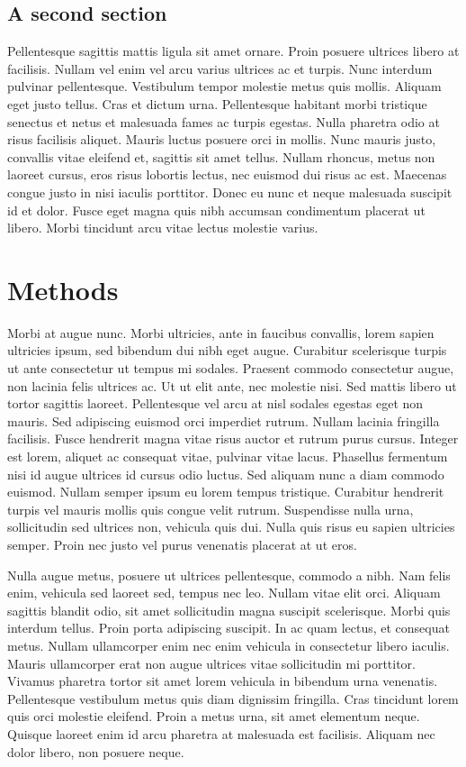 \documentclass[12pt, a4paper]{article}
\begin{document}
\subsection{A second section}
\label{subsec:intro:2}

Pellentesque sagittis mattis ligula sit amet ornare. Proin posuere ultrices libero at facilisis. Nullam vel enim vel arcu varius ultrices ac et turpis. Nunc interdum pulvinar pellentesque. Vestibulum tempor molestie metus quis mollis. Aliquam eget justo tellus. Cras et dictum urna. Pellentesque habitant morbi tristique senectus et netus et malesuada fames ac turpis egestas. Nulla pharetra odio at risus facilisis aliquet. Mauris luctus posuere orci in mollis. Nunc mauris justo, convallis vitae eleifend et, sagittis sit amet tellus. Nullam rhoncus, metus non laoreet cursus, eros risus lobortis lectus, nec euismod dui risus ac est. Maecenas congue justo in nisi iaculis porttitor. Donec eu nunc et neque malesuada suscipit id et dolor. Fusce eget magna quis nibh accumsan condimentum placerat ut libero. Morbi tincidunt arcu vitae lectus molestie varius.

\section{Methods}
\label{sec:methods}

Morbi at augue nunc. Morbi ultricies, ante in faucibus convallis, lorem sapien ultricies ipsum, sed bibendum dui nibh eget augue. Curabitur scelerisque turpis ut ante consectetur ut tempus mi sodales. Praesent commodo consectetur augue, non lacinia felis ultrices ac. Ut ut elit ante, nec molestie nisi. Sed mattis libero ut tortor sagittis laoreet. Pellentesque vel arcu at nisl sodales egestas eget non mauris. Sed adipiscing euismod orci imperdiet rutrum. Nullam lacinia fringilla facilisis. Fusce hendrerit magna vitae risus auctor et rutrum purus cursus. Integer est lorem, aliquet ac consequat vitae, pulvinar vitae lacus. Phasellus fermentum nisi id augue ultrices id cursus odio luctus. Sed aliquam nunc a diam commodo euismod. Nullam semper ipsum eu lorem tempus tristique. Curabitur hendrerit turpis vel mauris mollis quis congue velit rutrum. Suspendisse nulla urna, sollicitudin sed ultrices non, vehicula quis dui. Nulla quis risus eu sapien ultricies semper. Proin nec justo vel purus venenatis placerat at ut eros.

Nulla augue metus, posuere ut ultrices pellentesque, commodo a nibh. Nam felis enim, vehicula sed laoreet sed, tempus nec leo. Nullam vitae elit orci. Aliquam sagittis blandit odio, sit amet sollicitudin magna suscipit scelerisque. Morbi quis interdum tellus. Proin porta adipiscing suscipit. In ac quam lectus, et consequat metus. Nullam ullamcorper enim nec enim vehicula in consectetur libero iaculis. Mauris ullamcorper erat non augue ultrices vitae sollicitudin mi porttitor. Vivamus pharetra tortor sit amet lorem vehicula in bibendum urna venenatis. Pellentesque vestibulum metus quis diam dignissim fringilla. Cras tincidunt lorem quis orci molestie eleifend. Proin a metus urna, sit amet elementum neque. Quisque laoreet enim id arcu pharetra at malesuada est facilisis. Aliquam nec dolor libero, non posuere neque.
\end{document}
